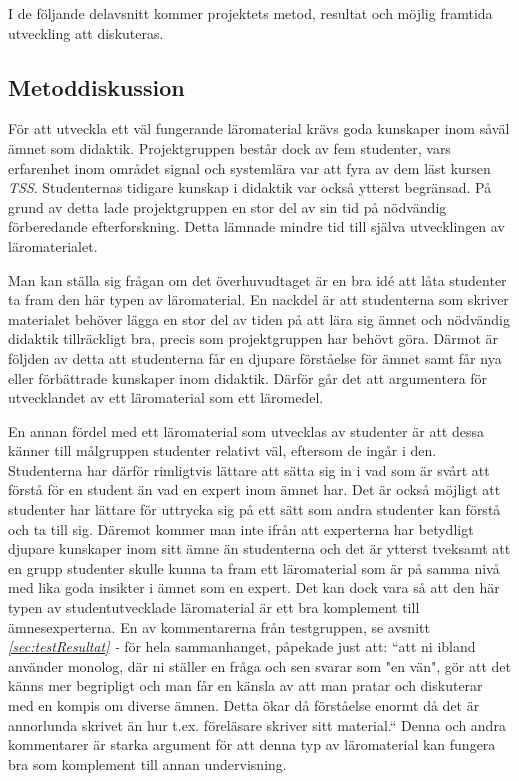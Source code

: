\documentclass[12pt,a4paper,twoside,openright]{article}
\begin{document}
I de följande delavsnitt kommer projektets metod, resultat och möjlig
framtida utveckling att diskuteras.

\subsection{Metoddiskussion}
\label{sec:metDisk}
För att utveckla ett väl fungerande läromaterial krävs goda kunskaper
inom såväl ämnet som didaktik. Projektgruppen består dock av fem studenter, vars erfarenhet
inom området signal och systemlära var att fyra av dem läst kursen
\textit{TSS}. Studenternas tidigare kunskap i didaktik var också
ytterst begränsad. På grund av detta lade projekt\-gruppen en stor del
av sin tid på nödvändig förberedande efterforskning. Detta lämnade
mindre tid till själva utvecklingen av läromaterialet.

Man kan ställa sig frågan om det överhuvudtaget är en bra idé att
låta studenter ta fram den här typen av läromaterial. En nackdel
är att studenterna som skriver materialet behöver lägga en stor
del av tiden på att lära sig ämnet och nödvändig didaktik
tillräckligt bra, precis som projektgruppen har behövt göra.
Därmot är följden av detta att studenterna
får en djupare förståelse för ämnet samt får nya
eller förbättrade kunskaper inom didaktik.
Därför går det att argumentera för utvecklandet av ett läromaterial
som ett läromedel.

En annan fördel med ett läromaterial som utvecklas av studenter
är att dessa känner till målgruppen studenter relativt väl,
eftersom de ingår i den. Studenterna har därför rimligtvis lättare
att sätta sig in i vad som är svårt att förstå för en student
än vad en expert inom ämnet har. Det är också möjligt att studenter
har lättare för uttrycka sig på ett sätt som andra studenter
kan förstå och ta till sig. Däremot kommer man inte ifrån
att experterna har betydligt djupare kunskaper inom sitt ämne
än studenterna och det är ytterst tveksamt att en grupp studenter
skulle kunna ta fram ett läromaterial som är på samma nivå med
lika goda insikter i ämnet som en expert. Det kan dock vara så
att den här typen av studentutvecklade läromaterial är ett bra
komplement till ämnesexperterna. En av kommentarerna från
testgruppen, se avsnitt \textit{\ref{sec:testResultat} - } för hela sammanhanget,
påpekade just att: “att ni ibland använder monolog, där ni
ställer en fråga och sen svarar som "en vän", gör
att det känns mer begripligt och man får en känsla av att man
pratar och diskuterar med en kompis om diverse ämnen. Detta
ökar då förståelse enormt då det är annorlunda skrivet än hur
t.ex. föreläsare skriver sitt material.“ Denna och andra
kommentarer är starka argument för att denna typ av
läromaterial kan fungera bra som komplement till annan
undervisning.
\end{document}
